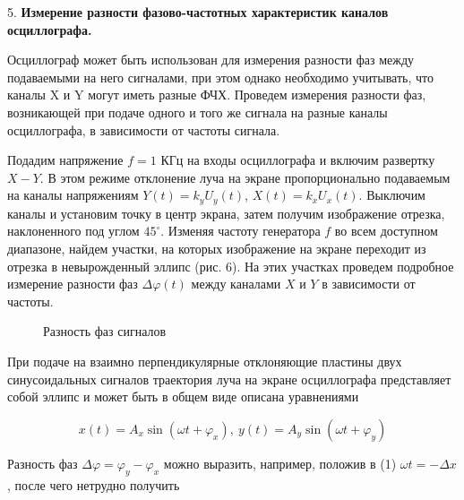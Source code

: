 \documentclass[14pt]{article}
\begin{document}
\vspace{0.5cm}
5. \textbf{Измерение разности фазово-частотных характеристик каналов осциллографа.}

Осциллограф может быть использован для измерения разности фаз между подаваемыми на него сигналами, при этом однако необходимо учитывать, что каналы X и Y могут иметь разные ФЧХ. Проведем измерения разности фаз, возникающей при подаче одного и того же сигнала на разные каналы осциллографа, в зависимости от частоты сигнала.

Подадим напряжение $f = 1$ КГц на входы осциллографа и включим развертку $X-Y$. В этом режиме отклонение луча на экране пропорционально подаваемым на каналы напряжениям $Y(t) = k_yU_y(t)$, $X	(t) = k_xU_x(t)$. Выключим каналы и установим точку в центр экрана, затем получим изображение отрезка, наклоненного под углом $45^{\circ}$. Изменяя частоту генератора $f$ во всем доступном диапазоне, найдем участки, на которых изображение на экране переходит из отрезка в невырожденный эллипс (рис. 6). На этих участках проведем подробное измерение разности фаз $\Delta \varphi(t)$ между каналами $X$ и $Y$ в зависимости от частоты.

\begin{figure}[h!]
	\caption{Разность фаз сигналов}
	\label{fig:image}
\end{figure}

При подаче на взаимно перпендикулярные отклоняющие пластины двух синусоидальных сигналов траектория луча на экране осциллографа представляет собой эллипс и может быть в общем виде описана уравнениями

\setcounter{equation}{0}
\begin{equation}
x(t) = A_x \sin(\omega t + \varphi_x),~
y(t) = A_y \sin(\omega t + \varphi_y)
\end{equation}

\noindent Разность фаз $\Delta\varphi = \varphi_y - \varphi_x$ можно выразить, например, положив в (1) $\omega t = - \Delta x$, после чего нетрудно получить
\end{document}
